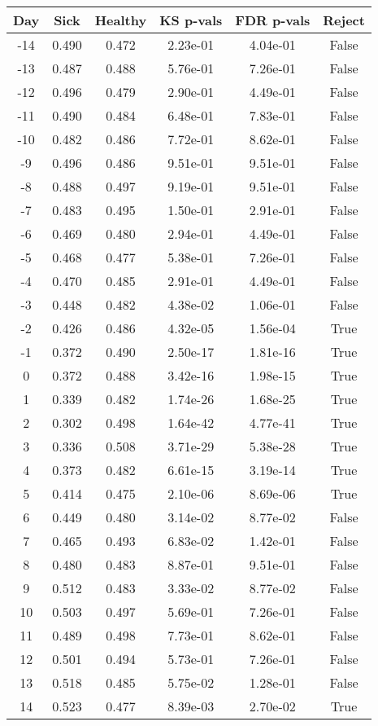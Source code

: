 \begin{tabular}{c|c|c|c|c|c}
Day &  Sick & Healthy &  KS p-vals & FDR p-vals & Reject\\
\hline
-14 & 0.490 &   0.472 &   2.23e-01 &   4.04e-01 &  False\\
-13 & 0.487 &   0.488 &   5.76e-01 &   7.26e-01 &  False\\
-12 & 0.496 &   0.479 &   2.90e-01 &   4.49e-01 &  False\\
-11 & 0.490 &   0.484 &   6.48e-01 &   7.83e-01 &  False\\
-10 & 0.482 &   0.486 &   7.72e-01 &   8.62e-01 &  False\\
 -9 & 0.496 &   0.486 &   9.51e-01 &   9.51e-01 &  False\\
 -8 & 0.488 &   0.497 &   9.19e-01 &   9.51e-01 &  False\\
 -7 & 0.483 &   0.495 &   1.50e-01 &   2.91e-01 &  False\\
 -6 & 0.469 &   0.480 &   2.94e-01 &   4.49e-01 &  False\\
 -5 & 0.468 &   0.477 &   5.38e-01 &   7.26e-01 &  False\\
 -4 & 0.470 &   0.485 &   2.91e-01 &   4.49e-01 &  False\\
 -3 & 0.448 &   0.482 &   4.38e-02 &   1.06e-01 &  False\\
 -2 & 0.426 &   0.486 &   4.32e-05 &   1.56e-04 &   True\\
 -1 & 0.372 &   0.490 &   2.50e-17 &   1.81e-16 &   True\\
  0 & 0.372 &   0.488 &   3.42e-16 &   1.98e-15 &   True\\
  1 & 0.339 &   0.482 &   1.74e-26 &   1.68e-25 &   True\\
  2 & 0.302 &   0.498 &   1.64e-42 &   4.77e-41 &   True\\
  3 & 0.336 &   0.508 &   3.71e-29 &   5.38e-28 &   True\\
  4 & 0.373 &   0.482 &   6.61e-15 &   3.19e-14 &   True\\
  5 & 0.414 &   0.475 &   2.10e-06 &   8.69e-06 &   True\\
  6 & 0.449 &   0.480 &   3.14e-02 &   8.77e-02 &  False\\
  7 & 0.465 &   0.493 &   6.83e-02 &   1.42e-01 &  False\\
  8 & 0.480 &   0.483 &   8.87e-01 &   9.51e-01 &  False\\
  9 & 0.512 &   0.483 &   3.33e-02 &   8.77e-02 &  False\\
 10 & 0.503 &   0.497 &   5.69e-01 &   7.26e-01 &  False\\
 11 & 0.489 &   0.498 &   7.73e-01 &   8.62e-01 &  False\\
 12 & 0.501 &   0.494 &   5.73e-01 &   7.26e-01 &  False\\
 13 & 0.518 &   0.485 &   5.75e-02 &   1.28e-01 &  False\\
 14 & 0.523 &   0.477 &   8.39e-03 &   2.70e-02 &   True\\
\end{tabular}